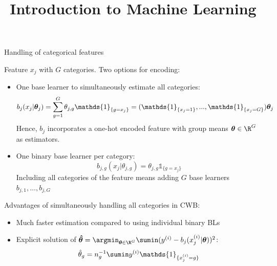 \documentclass[11pt,compress,t,notes=noshow, xcolor=table]{beamer}
\title{Introduction to Machine Learning}
\begin{document}

\begin{vbframe}{Handling of categorical features}

Feature $x_j$ with $G$ categories. Two options for encoding:

\begin{itemize}
    \item 
        One base learner to simultaneously estimate all categories: 
        $$b_j(x_j | \thetav_j) = \sum_{g=1}^G \theta_{j,g}\mathds{1}_{\{g = x_j\}} = (\mathds{1}_{\{x_j = 1\}}, ..., \mathds{1}_{\{x_j = G\}}) \thetav_j$$
        Hence, $b_j$ incorporates a one-hot encoded feature with group means $\thetav\in\R^G$ as estimators. 
    
    \item 
        One binary base learner per category:
        $$b_{j,g}(x_j | \theta_{j,g}) = \theta_{j,g}\mathds{1}_{\{g = x_j\}}$$  
        Including all categories of the feature means adding $G$ base learners $b_{j,1}, \dots, b_{j,G}$ %
  \end{itemize}

\framebreak

Advantages of simultaneously handling all categories in CWB: 
\begin{itemize}
    \item 
        Much faster estimation compared to using individual binary BLs

    \item 
        Explicit solution of $\thetavh = \argmin_{\thetav\in\R^G}\sumin (\yi - b_j(x^{(i)}_j | \thetav))^2$:
        $$
        \thetah_g = n_g^{-1}\sumin \yi \mathds{1}_{\{x^{(i)}_j = g\}}
        $$


\end{itemize}
\end{vbframe}
\end{document}
